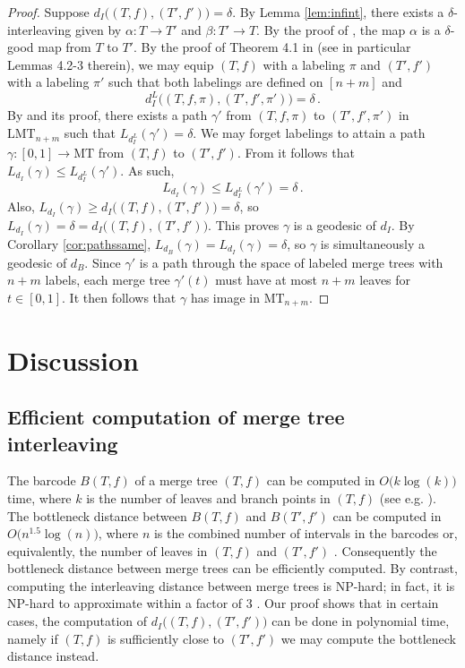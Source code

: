 \documentclass{article}
\theoremstyle{definition}
\newcommand{\MT}{\mathrm{MT}}
\newcommand{\LMT}{\mathrm{LMT}}
\begin{document}
\begin{proof}
    Suppose $d_I\big((T,f), (T',f')\big) = \delta$. By Lemma \ref{lem:infint}, there exists a $\delta$-interleaving given by $\alpha:T\to T'$ and $\beta:T' \to T$. By the proof of \cite[Lemma 1]{touli2022fpt}, the map $\alpha$ is a $\delta$-good map from $T$ to $T'$. By the proof of Theorem 4.1 in \cite{gasparovic2025intrinsic} (see in particular Lemmas 4.2-3 therein), we may equip $(T,f)$ with a labeling $\pi$ and $(T',f')$ with a labeling $\pi'$ such that both labelings are defined on $[n + m]$ and
    \begin{equation*}
        d_I^L\big((T,f,\pi), (T',f',\pi')\big) = \delta\,.
    \end{equation*}
    By \cite[Corollary 3.2]{gasparovic2025intrinsic} and its proof, there exists a path $\gamma'$ from $(T,f, \pi)$ to $(T',f',\pi')$ in $\LMT_{n+m}$ such that $L_{d_I^L}(\gamma') = \delta$. We may forget labelings to attain a path $\gamma:[0,1] \to \MT$ from $(T,f)$ to $(T',f')$. From \cite[Theorem 4.1]{gasparovic2025intrinsic} it follows that $L_{d_I}(\gamma) \leq L_{d_I^L}(\gamma')$. As such,
    \begin{equation*}
        L_{d_I}(\gamma) \leq L_{d_I^L}(\gamma') = \delta\,.
    \end{equation*}
    Also, $L_{d_I}(\gamma) \geq d_I\big((T,f),(T',f')\big) = \delta$, so $L_{d_I}(\gamma) = \delta = d_I\big((T,f), (T',f')\big)$. This proves $\gamma$ is a geodesic of $d_I$. By Corollary \ref{cor:pathssame}, $L_{d_B}(\gamma) = L_{d_I}(\gamma) = \delta$, so $\gamma$ is simultaneously a geodesic of $d_B$. Since $\gamma'$ is a path through the space of labeled merge trees with $n+m$ labels, each merge tree $\gamma'(t)$ must have at most $n + m$ leaves for $t \in [0,1]$. It then follows that $\gamma$ has image in $\MT_{n+m}$.
\end{proof}

\section{Discussion}
\subsection{Efficient computation of merge tree interleaving}
The barcode $B(T,f)$ of a merge tree $(T,f)$ can be computed in $O\big(k \log(k)\big)$ time, where $k$ is the number of leaves and branch points in $(T,f)$ (see e.g. \cite{edelsbrunner2010computational, rolle2024stable}). The bottleneck distance between $B(T,f)$ and $B(T',f')$ can be computed in $O\big(n^{1.5}\log(n)\big)$, where $n$ is the combined number of intervals in the barcodes or, equivalently, the number of leaves in $(T,f)$ and $(T',f')$ \cite{kerber2017geometry}. Consequently the bottleneck distance between merge trees can be efficiently computed. By contrast, computing the interleaving distance between merge trees is NP-hard; in fact, it is NP-hard to approximate within a factor of $3$ \cite{agarwal2018computing,touli2022fpt}. Our proof shows that in certain cases, the computation of $d_I\big((T,f),(T',f')\big)$ can be done in polynomial time, namely if $(T,f)$ is sufficiently close to $(T',f')$ we may compute the bottleneck distance instead.
\end{document}
